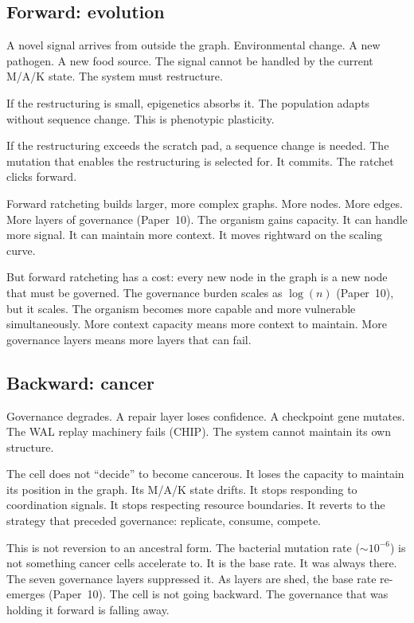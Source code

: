 \documentclass[11pt]{article}
\theoremstyle{definition}
\begin{document}
\subsection{Forward: evolution}

A novel signal arrives from outside the graph. Environmental change.
A new pathogen. A new food source. The signal cannot be handled by
the current M/A/K state. The system must restructure.

If the restructuring is small, epigenetics absorbs it. The population
adapts without sequence change. This is phenotypic plasticity.

If the restructuring exceeds the scratch pad, a sequence change is
needed. The mutation that enables the restructuring is selected for.
It commits. The ratchet clicks forward.

Forward ratcheting builds larger, more complex graphs. More nodes.
More edges. More layers of governance (Paper~10). The organism gains
capacity. It can handle more signal. It can maintain more context.
It moves rightward on the scaling curve.

But forward ratcheting has a cost: every new node in the graph is a
new node that must be governed. The governance burden scales as
$\log(n)$ (Paper~10), but it scales. The organism becomes more
capable and more vulnerable simultaneously. More context capacity
means more context to maintain. More governance layers means more
layers that can fail.

\subsection{Backward: cancer}

Governance degrades. A repair layer loses confidence. A checkpoint
gene mutates. The WAL replay machinery fails (CHIP). The system
cannot maintain its own structure.

The cell does not ``decide'' to become cancerous. It loses the
capacity to maintain its position in the graph. Its M/A/K state
drifts. It stops responding to coordination signals. It stops
respecting resource boundaries. It reverts to the strategy that
preceded governance: replicate, consume, compete.

This is not reversion to an ancestral form. The bacterial mutation
rate ($\sim 10^{-6}$) is not something cancer cells accelerate to.
It is the base rate. It was always there. The seven governance layers
suppressed it. As layers are shed, the base rate re-emerges
(Paper~10). The cell is not going backward. The governance that was
holding it forward is falling away.
\end{document}

